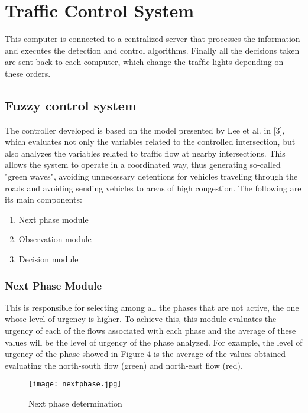 \documentclass{SureshLimkar}
\begin{document}
\chapter{Traffic Control System}
\hspace {0.5 in}This computer is connected
to a centralized server that processes the information and
executes the detection and control algorithms. Finally all the
decisions taken are sent back to each computer, which change
the trafﬁc lights depending on these orders.
\newpage
\section{Fuzzy control system}
The controller developed is based on the model presented by
Lee et al. in [3], which evaluates not only the variables related
to the controlled intersection, but also analyzes the variables
related to trafﬁc ﬂow at nearby intersections. This allows
the system to operate in a coordinated way, thus generating
so-called "green waves", avoiding unnecessary detentions for
vehicles traveling through the roads and avoiding sending
vehicles to areas of high congestion. The following are its main components:
\\

\begin{enumerate}
	\item {Next phase module}
	\item {Observation module}
	\item {Decision module}
	
\end{enumerate}

\subsection{Next Phase Module}
This is responsible for selecting among all the phases
that are not active, the one whose level of urgency is
higher. To achieve this, this module evaluates the urgency
of each of the ﬂows associated with each phase and the
average of these values will be the level of urgency of
the phase analyzed. For example, the level of urgency
of the phase showed in Figure 4 is the average of the
values obtained evaluating the north-south ﬂow (green)
and north-east ﬂow (red).

\begin{figure}[h]%
\centering
 \texttt{[image: nextphase.jpg]}%
\caption{Next phase determination}%
\label{Next phase}%
\end{figure}
\end{document}

